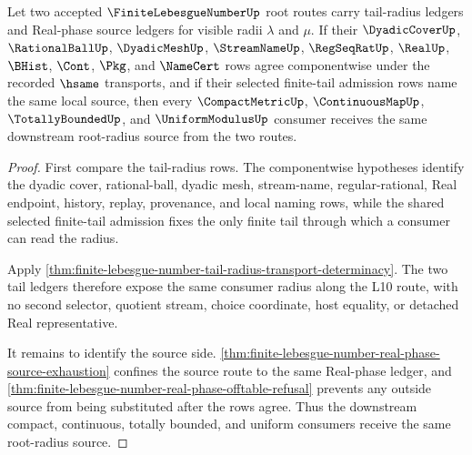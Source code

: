 \begin{theorem}
\label{thm:finite-lebesgue-number-root-radius-source-determinacy}
Let two accepted $\FiniteLebesgueNumberUp$ root routes carry tail-radius ledgers and Real-phase source ledgers for visible radii $\lambda$ and $\mu$. If their $\DyadicCoverUp$, $\RationalBallUp$, $\DyadicMeshUp$, $\StreamNameUp$, $\RegSeqRatUp$, $\RealUp$, $\BHist$, $\Cont$, $\Pkg$, and $\NameCert$ rows agree componentwise under the recorded $\hsame$ transports, and if their selected finite-tail admission rows name the same local source, then every $\CompactMetricUp$, $\ContinuousMapUp$, $\TotallyBoundedUp$, and $\UniformModulusUp$ consumer receives the same downstream root-radius source from the two routes.
\end{theorem}
\begin{proof}
First compare the tail-radius rows. The componentwise hypotheses identify the dyadic cover, rational-ball, dyadic mesh, stream-name, regular-rational, Real endpoint, history, replay, provenance, and local naming rows, while the shared selected finite-tail admission fixes the only finite tail through which a consumer can read the radius.

Apply \autoref{thm:finite-lebesgue-number-tail-radius-transport-determinacy}. The two tail ledgers therefore expose the same consumer radius along the L10 route, with no second selector, quotient stream, choice coordinate, host equality, or detached Real representative.

It remains to identify the source side. \autoref{thm:finite-lebesgue-number-real-phase-source-exhaustion} confines the source route to the same Real-phase ledger, and \autoref{thm:finite-lebesgue-number-real-phase-offtable-refusal} prevents any outside source from being substituted after the rows agree. Thus the downstream compact, continuous, totally bounded, and uniform consumers receive the same root-radius source.
\end{proof}

